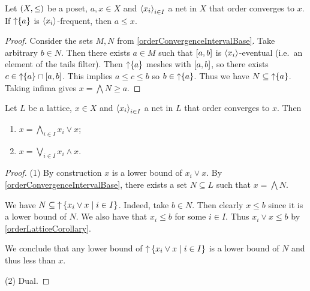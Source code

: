 \begin{lemma}
Let $\sSet{X,\leq}$ be a poset, $a,x\in X$ and $\left\langle x_i \right\rangle_{i\in I}$ a net in $X$ that order converges to $x$. If $\operatorname{\uparrow}\{a\}$ is $\left\langle x_i \right\rangle$-frequent, then $a\leq x$.
\end{lemma}
\begin{proof}
Consider the sets $M,N$ from \ref{orderConvergenceIntervalBase}. Take arbitrary $b\in N$. Then there exists $a\in M$ such that $\interval{a,b}$ is $\left\langle x_i \right\rangle$-eventual (i.e.\ an element of the tails filter). Then $\operatorname{\uparrow}\{a\}$ meshes with $\interval{a,b}$, so there exists $c\in \upset\{a\}\cap \interval{a,b}$. This implies $a\leq c\leq b$ so $b\in \operatorname{\uparrow}\{a\}$. Thus we have $N\subseteq \operatorname{\uparrow}\{a\}$. Taking infima gives $x = \bigwedge N \geq a$.
\end{proof}

\begin{lemma} \label{orderLimitMeetJoin}
Let $L$ be a lattice, $x\in X$ and $\left\langle x_i \right\rangle_{i\in I}$ a net in $L$ that order converges to $x$. Then
\begin{enumerate}
\item $x = \bigwedge_{i\in I}x_i \vee x$;
\item $x = \bigvee_{i\in I}x_i \wedge x$.
\end{enumerate}
\end{lemma}
\begin{proof}
(1) By construction $x$ is a lower bound of $x_i \vee x$. By \ref{orderConvergenceIntervalBase}, there exists a set $N\subseteq L$ such that $x = \bigwedge N$.

We have $N\subseteq \upset\setbuilder{x_i \vee x}{i\in I}$. Indeed, take $b\in N$. Then clearly $x\leq b$ since it is a lower bound of $N$. We also have that $x_i \leq b$ for some $i\in I$. Thus $x_i\vee x \leq b$ by \ref{orderLatticeCorollary}.

We conclude that any lower bound of $\upset\setbuilder{x_i \vee x}{i\in I}$ is a lower bound of $N$ and thus less than $x$.

(2) Dual.
\end{proof}

